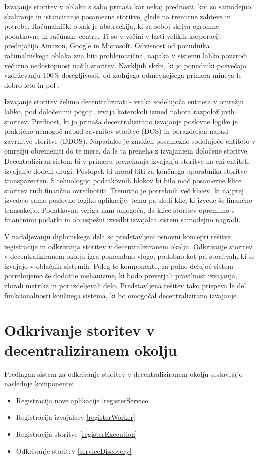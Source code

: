 \documentclass[a4paper, 12pt]{book}
\begin{document}
Izvajanje storitev v oblaku s sabo prinaša kar nekaj prednosti, kot so samodejno skaliranje in istanciranje posamezne storitve, glede na trenutne zahteve in potrebe.
Računalniški oblak je abstrackija, ki za seboj skriva ogromne podatkovne in računske centre.
Ti so v večini v lasti velikih korporacij, prednjačijo Amazon, Google in Microsoft.
Odvisnost od ponudnika računalniškega oblaka zna biti problematična, napaka v sistemu lahko povzroči večurno nedostopnost naših storitev. 
Navkljub skrbi, ki jo ponudniki posvečajo vzdrževanju 100\% dosegljivosti, od zadnjega odmevnejšega primera mineva le dobro leto in pol \cite{awsFail}.

Izvajanje storitev želimo decentralizirati - vsaka sodelujoča entiteta v omrežju lahko, pod določenimi pogoji, izvaja katerokoli izmed nabora razpoložljivih storitev.
Prednost, ki jo prinaša decentralizirano izvajanje poslovne logike je praktično nemogoč napad zavrnitev storitve (DOS) in porazdeljen napad zavrnitve storitve (DDOS).
Napadalec je zmožen posamezno sodelujočo entiteto v omrežju obremeniti do te mere, da le ta preneha z izvajanjem določene storitve.
Decentraliziran sistem bi v primeru prenehanja izvajanja storitve na eni entiteti izvajanje dodelil drugi. Postopek bi moral biti za končnega uporabnika storitve transparenten.
S tehnologijo podatkovnih blokov bi bilo moč posamezne klice storitev tudi finančno ovrednotiti.
Trenutno je potrebnih več klicev, ki najprej izvedejo samo poslovno logiko aplikacije, temu pa sledi klic, ki izvede še finančno transakcijo.
Podatkovna veriga nam omogoča, da klice storitev opremimo s finančnimi podatki in ob uspešni izvedbi izvajalca sistem samodejno nagradi.

V nadaljevanju diplomskega dela so predstavljeni osnovni koncepti rešitve registracije in odkrivanja storitev v decentraliziranem okolju.
Odkrivanje storitev v decentraliziranem okolju igra pomembno vlogo, podobno kot pri storitvah, ki se izvajajo v oblačnih sistemih.
Poleg te komponente, za polno delujoč sistem potrebujemo še dodatne mehanizme, ki bodo preverjali pravilnost izvajanja, zbirali metrike in porazdeljevali delo.
Predstavljena rešitev tako prispeva le del funkcionalnosti končnega sistema, ki bo omogočal decentralizirano izvajanje.

\section{Odkrivanje storitev v decentraliziranem okolju}

Predlagan sistem za odkrivanje storitev v decentraliziranem okolju sestavljajo naslednje komponente:
\begin{itemize}
	\item Registracija nove aplikacije \ref{registerService}
	\item Registracija izvajalcev \ref{registerWorker}
	\item Registracija storitve \ref{registerExecution}
	\item Odkrivanje storitev \ref{serviceDiscovery}
\end{itemize}
\end{document}
